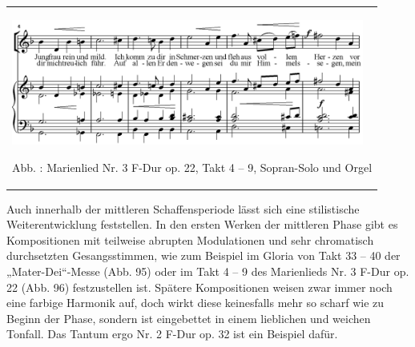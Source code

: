 \documentclass[a4paper]{article}
\newcounter{Abb}
\renewcommand\theAbb{\arabic{Abb}}
\begin{document}
\begin{center}
\tablefirsthead{}
\tablehead{}
\tabletail{}
\tablelasttail{}
\begin{supertabular}{m{11.78cm}}

\includegraphics[width=11.598cm,height=4.133cm]{pictures/zulassungsarbeit-img098.png}

\label{bkm:Ref99946259}Abb. \stepcounter{Abb}{\theAbb}: Marienlied Nr. 3
F-Dur op. 22, Takt 4 – 9, Sopran-Solo und Orgel\\
\end{supertabular}
\end{center}
Auch innerhalb der mittleren Schaffensperiode lässt sich eine
stilistische Weiterentwicklung feststellen. In den ersten Werken der
mittleren Phase gibt es Kompositionen mit teilweise abrupten
Modulationen und sehr chromatisch durchsetzten Gesangsstimmen, wie zum
Beispiel im Gloria von Takt 33 – 40 der „Mater-Dei“-Messe (Abb. 95)
oder im Takt 4 – 9 des Marienlieds Nr. 3 F-Dur op. 22 (Abb. 96)
festzustellen ist. Spätere Kompositionen weisen zwar immer noch eine
farbige Harmonik auf, doch wirkt diese keinesfalls mehr so scharf wie
zu Beginn der Phase, sondern ist eingebettet in einem lieblichen und
weichen Tonfall. Das Tantum ergo Nr. 2 F-Dur op. 32 ist ein Beispiel
dafür.
\end{document}
